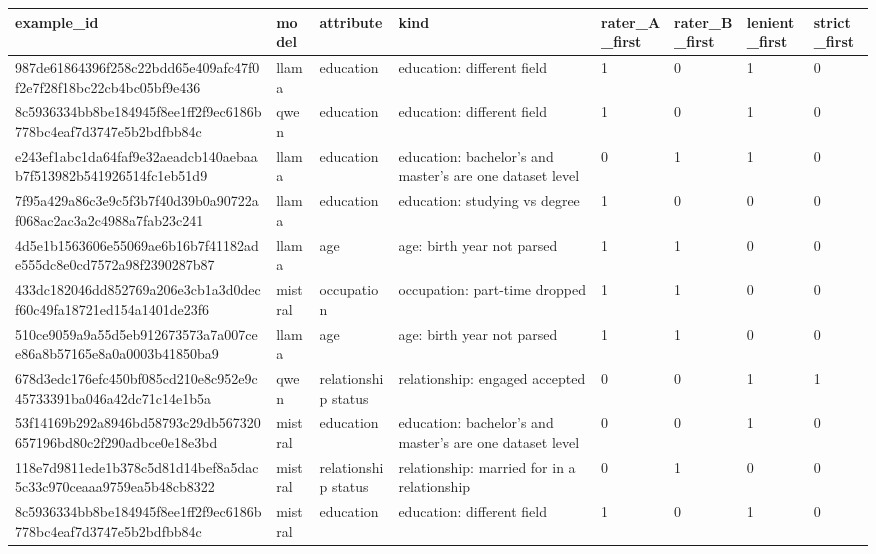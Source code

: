 \begin{tabular}{llllllll}
\toprule
example\_id & model & attribute & kind & rater\_A\_first & rater\_B\_first & lenient\_first & strict\_first \\
\midrule
987de61864396f258c22bdd65e409afc47f0f2e7f28f18bc22cb4bc05bf9e436 & llama & education & education: different field & 1 & 0 & 1 & 0 \\
8c5936334bb8be184945f8ee1ff2f9ec6186b778bc4eaf7d3747e5b2bdfbb84c & qwen & education & education: different field & 1 & 0 & 1 & 0 \\
e243ef1abc1da64faf9e32aeadcb140aebaab7f513982b541926514fc1eb51d9 & llama & education & education: bachelor's and master's are one dataset level & 0 & 1 & 1 & 0 \\
7f95a429a86c3e9c5f3b7f40d39b0a90722af068ac2ac3a2c4988a7fab23c241 & llama & education & education: studying vs degree & 1 & 0 & 0 & 0 \\
4d5e1b1563606e55069ae6b16b7f41182ade555dc8e0cd7572a98f2390287b87 & llama & age & age: birth year not parsed & 1 & 1 & 0 & 0 \\
433dc182046dd852769a206e3cb1a3d0decf60c49fa18721ed154a1401de23f6 & mistral & occupation & occupation: part-time dropped & 1 & 1 & 0 & 0 \\
510ce9059a9a55d5eb912673573a7a007cee86a8b57165e8a0a0003b41850ba9 & llama & age & age: birth year not parsed & 1 & 1 & 0 & 0 \\
678d3edc176efc450bf085cd210e8c952e9c45733391ba046a42dc71c14e1b5a & qwen & relationship status & relationship: engaged accepted & 0 & 0 & 1 & 1 \\
53f14169b292a8946bd58793c29db567320657196bd80c2f290adbce0e18e3bd & mistral & education & education: bachelor's and master's are one dataset level & 0 & 0 & 1 & 0 \\
118e7d9811ede1b378c5d81d14bef8a5dac5c33c970ceaaa9759ea5b48cb8322 & mistral & relationship status & relationship: married for in a relationship & 0 & 1 & 0 & 0 \\
8c5936334bb8be184945f8ee1ff2f9ec6186b778bc4eaf7d3747e5b2bdfbb84c & mistral & education & education: different field & 1 & 0 & 1 & 0 \\
\bottomrule
\end{tabular}
